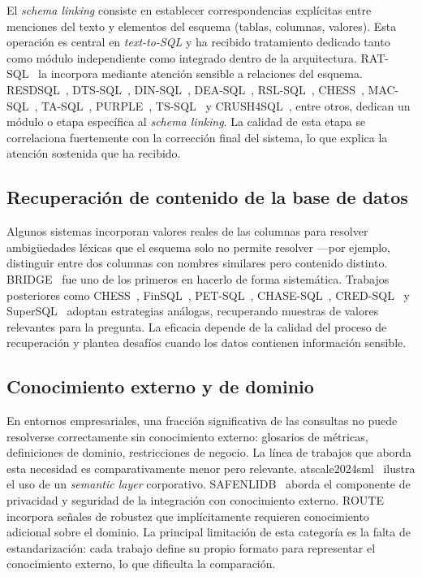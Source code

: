 El \emph{schema linking} consiste en establecer correspondencias
explícitas entre menciones del texto y elementos del esquema (tablas,
columnas, valores). Esta operación es central en \emph{text-to-SQL} y ha
recibido tratamiento dedicado tanto como módulo independiente como
integrado dentro de la arquitectura. RAT-SQL~\cite{RAT-SQL2021} la
incorpora mediante atención sensible a relaciones del esquema.
RESDSQL~\cite{RESDSQL2023}, DTS-SQL~\cite{DTS-SQL2024},
DIN-SQL~\cite{DIN-SQL2023}, DEA-SQL~\cite{DEA-SQL2024},
RSL-SQL~\cite{RSL-SQL2024}, CHESS~\cite{CHESS2024},
MAC-SQL~\cite{MAC-SQL2023}, TA-SQL~\cite{TA-SQL2024},
PURPLE~\cite{PURPLE2024}, TS-SQL~\cite{TS-SQL2025} y
CRUSH4SQL~\cite{CRUSH4SQL2023}, entre otros, dedican un módulo o etapa
específica al \emph{schema linking}. La calidad de esta etapa se
correlaciona fuertemente con la corrección final del sistema, lo que
explica la atención sostenida que ha recibido.

\subsection{Recuperación de contenido de la base de datos}
\label{subsec:sota-d4-content}

Algunos sistemas incorporan valores reales de las columnas para resolver
ambigüedades léxicas que el esquema solo no permite resolver
---por ejemplo, distinguir entre dos columnas con nombres similares pero
contenido distinto. BRIDGE~\cite{BRIDGE2020} fue uno de los primeros en
hacerlo de forma sistemática. Trabajos posteriores como
CHESS~\cite{CHESS2024}, FinSQL~\cite{FinSQL2024},
PET-SQL~\cite{PET-SQL2024}, CHASE-SQL~\cite{CHASE-SQL2025},
CRED-SQL~\cite{CRED-SQL2025} y SuperSQL~\cite{SuperSQL2024} adoptan
estrategias análogas, recuperando muestras de valores relevantes para la
pregunta. La eficacia depende de la calidad del proceso de recuperación
y plantea desafíos cuando los datos contienen información sensible.

\subsection{Conocimiento externo y de dominio}
\label{subsec:sota-d4-external}

En entornos empresariales, una fracción significativa de las consultas
no puede resolverse correctamente sin conocimiento externo: glosarios de
métricas, definiciones de dominio, restricciones de negocio. La línea
de trabajos que aborda esta necesidad es comparativamente menor pero
relevante. atscale2024sml~\cite{atscale2024sml} ilustra el uso de un
\emph{semantic layer} corporativo. SAFENLIDB~\cite{SAFENLIDB} aborda el
componente de privacidad y seguridad de la integración con conocimiento
externo. ROUTE~\cite{ROUTE2025} incorpora señales de robustez que
implícitamente requieren conocimiento adicional sobre el dominio.
La principal limitación de esta categoría es la falta de
estandarización: cada trabajo define su propio formato para representar
el conocimiento externo, lo que dificulta la comparación.

